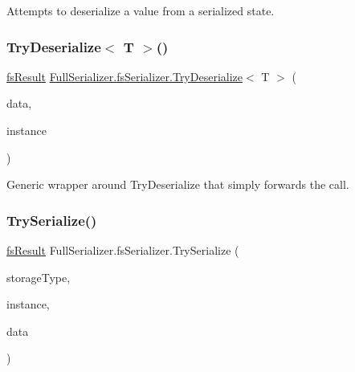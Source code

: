 Attempts to deserialize a value from a serialized state. 

\mbox{\label{class_full_serializer_1_1fs_serializer_aa9ce7d2b3fe6c0057504cba48b63e649}} 
\subsubsection{\texorpdfstring{Try\+Deserialize$<$ T $>$()}{TryDeserialize< T >()}}
{\footnotesize\ttfamily \hyperlink{struct_full_serializer_1_1fs_result}{fs\+Result} \hyperlink{class_full_serializer_1_1fs_serializer_a9ada1781fcc582b65d809815fe2c24e9}{Full\+Serializer.\+fs\+Serializer.\+Try\+Deserialize}$<$ T $>$ (\begin{DoxyParamCaption}\item[{\hyperlink{class_full_serializer_1_1fs_data}{fs\+Data}}]{data,  }\item[{ref T}]{instance }\end{DoxyParamCaption})\hspace{0.3cm}{\ttfamily [inline]}}



Generic wrapper around Try\+Deserialize that simply forwards the call. 

\mbox{\label{class_full_serializer_1_1fs_serializer_a17e5574115d10ded25ac40d46eeae4f2}} 
\subsubsection{\texorpdfstring{Try\+Serialize()}{TrySerialize()}\hspace{0.1cm}{\footnotesize\ttfamily [1/2]}}
{\footnotesize\ttfamily \hyperlink{struct_full_serializer_1_1fs_result}{fs\+Result} Full\+Serializer.\+fs\+Serializer.\+Try\+Serialize (\begin{DoxyParamCaption}\item[{Type}]{storage\+Type,  }\item[{object}]{instance,  }\item[{out \hyperlink{class_full_serializer_1_1fs_data}{fs\+Data}}]{data }\end{DoxyParamCaption})\hspace{0.3cm}{\ttfamily [inline]}}



